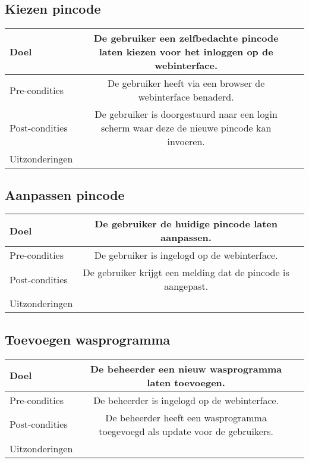 \subsection{Kiezen pincode}
\begin{center}
  \begin{tabular}{ l | c | r | }
    \hline
    Doel & De gebruiker een zelfbedachte pincode laten kiezen voor het inloggen op de webinterface. \\ \hline
    Pre-condities & De gebruiker heeft via een browser de webinterface benaderd. \\ \hline
    Post-condities & De gebruiker is doorgestuurd naar een login scherm waar deze de nieuwe pincode kan invoeren. \\ \hline
    Uitzonderingen &  \\
    \hline
  \end{tabular}
\end{center}

\subsection{Aanpassen pincode}
\begin{center}
  \begin{tabular}{ l | c | r | }
    \hline
    Doel & De gebruiker de huidige pincode laten aanpassen. \\ \hline
    Pre-condities & De gebruiker is ingelogd op de webinterface. \\ \hline
    Post-condities & De gebruiker krijgt een melding dat de pincode is aangepast. \\ \hline
	Uitzonderingen &  \\
    \hline
  \end{tabular}
\end{center}

\subsection{Toevoegen wasprogramma}
\begin{center}
  \begin{tabular}{ l | c | r | }
    \hline
    Doel & De beheerder een nieuw wasprogramma laten toevoegen. \\ \hline
    Pre-condities & De beheerder is ingelogd op de webinterface. \\ \hline
    Post-condities & De beheerder heeft een wasprogramma toegevoegd als update voor de gebruikers. \\ \hline
	Uitzonderingen &  \\
    \hline
  \end{tabular}
\end{center}
